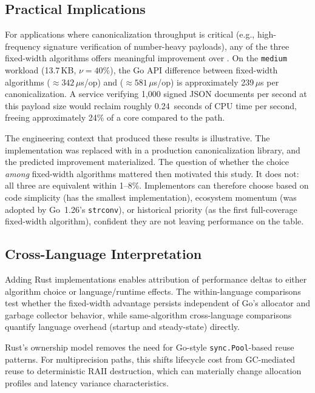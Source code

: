 \subsection{Practical Implications}

For applications where canonicalization throughput is critical (e.g.,
high-frequency signature verification of number-heavy payloads),
any of the three fixed-width algorithms offers meaningful improvement
over \burgerdybvig.  On the \texttt{medium} workload (13.7\,KB,
$\nu = 40\%$), the Go API difference between fixed-width algorithms
(${\approx}342\,\mu$s/op) and \burgerdybvig
(${\approx}581\,\mu$s/op) is approximately 239\,$\mu$s per
canonicalization.  A service verifying 1{,}000 signed JSON
documents per second at this payload size would reclaim roughly
0.24~seconds of CPU time per second, freeing approximately 24\% of
a core compared to the \burgerdybvig path.

The engineering context that produced these results is illustrative.
The \burgerdybvig implementation was replaced with \schubfach in a
production canonicalization library, and the predicted improvement
materialized.  The question of whether the choice \emph{among}
fixed-width algorithms mattered then motivated this study.  It does
not: all three are equivalent within 1--8\%.  Implementors can
therefore choose based on code simplicity (\schubfach has the smallest
implementation), ecosystem momentum (\dragonbox was adopted by
Go~1.26's \texttt{strconv}), or historical priority (\ryualg as the
first full-coverage fixed-width algorithm), confident they are not
leaving performance on the table.

\subsection{Cross-Language Interpretation}

Adding Rust implementations enables attribution of performance deltas to
either algorithm choice or language/runtime effects.  The within-language
comparisons test whether the fixed-width advantage persists independent of
Go's allocator and garbage collector behavior, while same-algorithm
cross-language comparisons quantify language overhead (startup and
steady-state) directly.

Rust's ownership model removes the need for Go-style
\texttt{sync.Pool}-based reuse patterns.  For multiprecision paths, this
shifts lifecycle cost from GC-mediated reuse to deterministic RAII
destruction, which can materially change allocation profiles and latency
variance characteristics.

